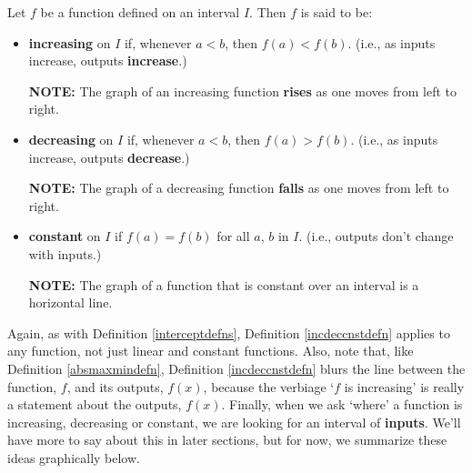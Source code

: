 \documentclass{ximera}
\begin{document}

\begin{definition}

\label{incdeccnstdefn}

Let $f$ be a function defined on an interval $I$.  Then $f$ is said to be:

\begin{itemize}

\item  \textbf{increasing} on $I$ if, whenever $a < b$, then $f(a) < f(b)$.   (i.e., as inputs increase, outputs \textbf{increase}.)

\textbf{NOTE:}  The graph of an increasing function  \textbf{rises} as one moves from left to right.

\item  \textbf{decreasing} on $I$ if, whenever $a < b$, then $f(a) > f(b)$.  (i.e., as inputs increase, outputs \textbf{decrease}.)

\textbf{NOTE:}  The graph of a decreasing function \textbf{falls} as one moves from left to right.

\item  \textbf{constant} on $I$ if $f(a) = f(b)$ for all $a$, $b$ in $I$.  (i.e., outputs don't change with inputs.)

\textbf{NOTE:}  The graph of a function that is constant over an interval is a horizontal line.

\end{itemize}

\end{definition}




Again, as with Definition \ref{interceptdefns}, Definition  \ref{incdeccnstdefn} applies to any function, not just linear and constant functions.  Also, note that, like Definition \ref{absmaxmindefn}, Definition \ref{incdeccnstdefn}  blurs the line between the function, $f$, and its outputs, $f(x)$, because the verbiage `$f$ is increasing' is really a statement about the outputs, $f(x)$.  Finally, when we ask `where' a function is increasing, decreasing or constant, we are looking for an interval of \textbf{inputs}.  We'll have more to say about this in later sections, but for now, we summarize these ideas graphically below.
\end{document}

